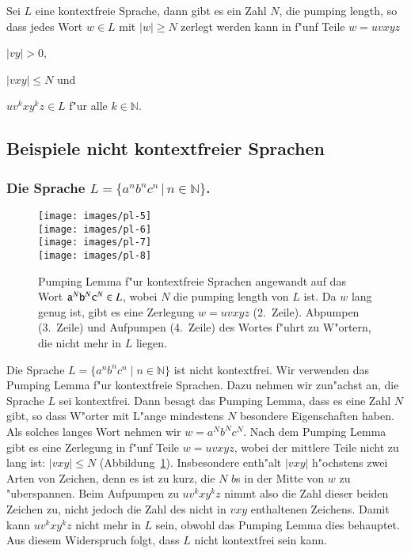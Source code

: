 \begin{satz}
Sei $L$ eine kontextfreie Sprache, dann gibt es ein Zahl $N$, die pumping
length, so dass jedes Wort $w\in L$ mit $|w|\ge N$ zerlegt werden
kann in f"unf Teile $w=uvxyz$
\begin{compactenum}
\item
$|vy|>0$,
\item
$|vxy|\le N$ und
\item
$uv^kxy^kz\in L$ f"ur alle $k\in\mathbb N$.
\end{compactenum}
\end{satz}

\subsection{Beispiele nicht kontextfreier Sprachen}
\subsubsection{Die Sprache $L=\{a^nb^nc^n\,|\,n\in\mathbb N\}$.}
\begin{figure}
\begin{center}
\texttt{[image: images/pl-5]}\\%
\smallskip
\texttt{[image: images/pl-6]}\\%
\smallskip
\texttt{[image: images/pl-7]}\\%
\smallskip
\texttt{[image: images/pl-8]}%
\end{center}
\caption{Pumping Lemma f"ur kontextfreie Sprachen angewandt auf das 
Wort ${\tt a}^N{\tt b}^N{\tt c }^N\in L$, wobei $N$ die pumping length
von $L$ ist. Da $w$ lang genug ist, gibt es eine Zerlegung 
$w=uvxyz$ (2.~Zeile).
Abpumpen (3.~Zeile) und Aufpumpen (4.~Zeile) des
Wortes f"uhrt zu W"ortern, die nicht mehr in $L$ liegen.\label{pumpingcfgimage}}
\end{figure}

Die Sprache $L=\{a^nb^nc^n\;|\;n\in\mathbb N\}$ ist nicht kontextfrei.
Wir verwenden das Pumping Lemma f"ur kontextfreie Sprachen.  Dazu
nehmen wir zun"achst an, die Sprache $L$ sei kontextfrei. Dann
besagt das Pumping Lemma, dass es eine Zahl $N$ gibt, so dass
W"orter mit L"ange mindestens $N$ besondere Eigenschaften haben.
Als solches langes Wort nehmen wir $w=a^Nb^Nc^N$. Nach dem
Pumping Lemma gibt es eine Zerlegung in f"unf Teile
$w=uvxyz$, wobei der mittlere Teile nicht zu lang ist:
$|vxy|\le N$ (Abbildung~\ref{pumpingcfgimage}).
Insbesondere enth"alt $|vxy|$ h"ochstens zwei
Arten von Zeichen, denn es ist zu kurz, die $N$ $b$s in der Mitte
von $w$ zu "uberspannen. Beim Aufpumpen zu $uv^kxy^kz$ nimmt also
die Zahl dieser beiden Zeichen zu, nicht jedoch die Zahl des nicht
in $vxy$ enthaltenen Zeichens.
Damit kann $uv^kxy^kz$ nicht mehr in $L$ sein, obwohl das
Pumping Lemma dies behauptet. Aus diesem Widerspruch folgt,
dass $L$ nicht kontextfrei sein kann.


